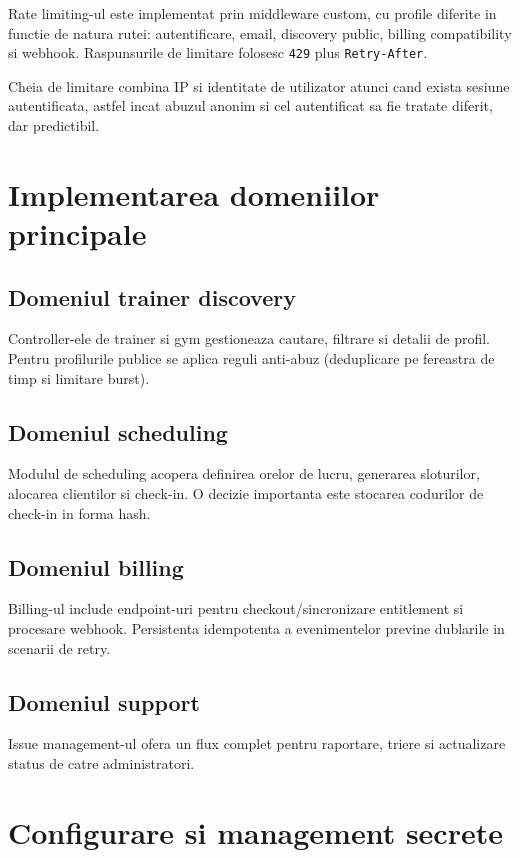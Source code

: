 Rate limiting-ul este implementat prin middleware custom, cu profile diferite in functie de natura rutei: autentificare, email, discovery public, billing compatibility si webhook. Raspunsurile de limitare folosesc \texttt{429} plus \texttt{Retry-After}.

Cheia de limitare combina IP si identitate de utilizator atunci cand exista sesiune autentificata, astfel incat abuzul anonim si cel autentificat sa fie tratate diferit, dar predictibil.

\section{Implementarea domeniilor principale}

\subsection{Domeniul trainer discovery}

Controller-ele de trainer si gym gestioneaza cautare, filtrare si detalii de profil. Pentru profilurile publice se aplica reguli anti-abuz (deduplicare pe fereastra de timp si limitare burst).

\subsection{Domeniul scheduling}

Modulul de scheduling acopera definirea orelor de lucru, generarea sloturilor, alocarea clientilor si check-in. O decizie importanta este stocarea codurilor de check-in in forma hash.

\subsection{Domeniul billing}

Billing-ul include endpoint-uri pentru checkout/sincronizare entitlement si procesare webhook. Persistenta idempotenta a evenimentelor previne dublarile in scenarii de retry.

\subsection{Domeniul support}

Issue management-ul ofera un flux complet pentru raportare, triere si actualizare status de catre administratori.

\section{Configurare si management secrete}


